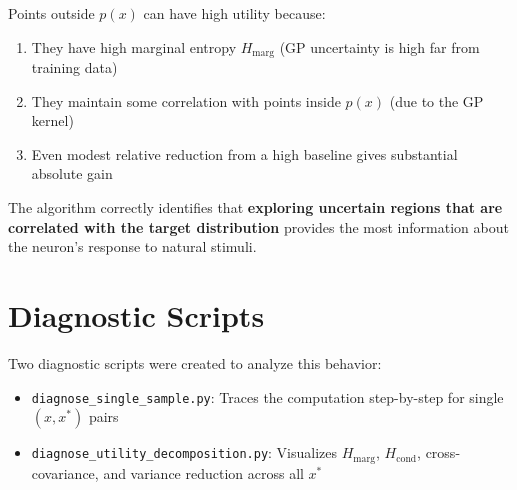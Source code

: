 \documentclass[a4paper,11pt]{article}
\newcommand{\Hmarg}{H_{\mathrm{marg}}}
\newcommand{\Hcond}{H_{\mathrm{cond}}}
\begin{document}
Points outside $p(x)$ can have high utility because:
\begin{enumerate}
    \item They have high marginal entropy $\Hmarg$ (GP uncertainty is high far from training data)
    \item They maintain some correlation with points inside $p(x)$ (due to the GP kernel)
    \item Even modest relative reduction from a high baseline gives substantial absolute gain
\end{enumerate}

The algorithm correctly identifies that \textbf{exploring uncertain regions that are correlated with the target distribution} provides the most information about the neuron's response to natural stimuli.

\section{Diagnostic Scripts}

Two diagnostic scripts were created to analyze this behavior:
\begin{itemize}
    \item \texttt{diagnose\_single\_sample.py}: Traces the computation step-by-step for single $(x, x^*)$ pairs
    \item \texttt{diagnose\_utility\_decomposition.py}: Visualizes $\Hmarg$, $\Hcond$, cross-covariance, and variance reduction across all $x^*$
\end{itemize}
\end{document}
